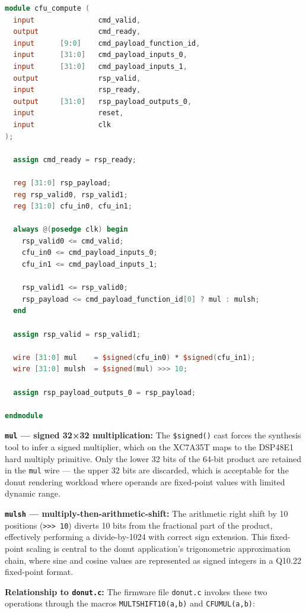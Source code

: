\begin{lstlisting}[style=mystyle, language=Verilog]
module cfu_compute (
  input               cmd_valid,
  output              cmd_ready,
  input      [9:0]    cmd_payload_function_id,
  input      [31:0]   cmd_payload_inputs_0,
  input      [31:0]   cmd_payload_inputs_1,
  output              rsp_valid,
  input               rsp_ready,
  output     [31:0]   rsp_payload_outputs_0,
  input               reset,
  input               clk
);

  assign cmd_ready = rsp_ready;

  reg [31:0] rsp_payload;
  reg rsp_valid0, rsp_valid1;
  reg [31:0] cfu_in0, cfu_in1;

  always @(posedge clk) begin
    rsp_valid0 <= cmd_valid;
    cfu_in0 <= cmd_payload_inputs_0;
    cfu_in1 <= cmd_payload_inputs_1;

    rsp_valid1 <= rsp_valid0;
    rsp_payload <= cmd_payload_function_id[0] ? mul : mulsh;
  end

  assign rsp_valid = rsp_valid1;

  wire [31:0] mul    = $signed(cfu_in0) * $signed(cfu_in1);
  wire [31:0] mulsh  = $signed(mul) >>> 10;

  assign rsp_payload_outputs_0 = rsp_payload;

endmodule
\end{lstlisting}

\textbf{\texttt{mul} — signed 32×32 multiplication:} The \texttt{\$signed()} cast forces the synthesis tool to infer a signed multiplier, which on the XC7A35T maps to the DSP48E1 hard multiply primitive. Only the lower 32 bits of the 64-bit product are retained in the \texttt{mul} wire — the upper 32 bits are discarded, which is acceptable for the donut rendering workload where operands are fixed-point values with limited dynamic range.

\textbf{\texttt{mulsh} — multiply-then-arithmetic-shift:} The arithmetic right shift by 10 positions (\texttt{\textgreater{}\textgreater{}\textgreater{} 10}) diverts 10 bits from the fractional part of the product, effectively performing a divide-by-1024 with correct sign extension. This fixed-point scaling is central to the donut application's trigonometric approximation chain, where sine and cosine values are represented as signed integers in a Q10.22 fixed-point format.

\textbf{Relationship to \texttt{donut.c}:} The firmware file \texttt{donut.c} invokes these two operations through the macros \texttt{MULTSHIFT10(a,b)} and \texttt{CFUMUL(a,b)}:

